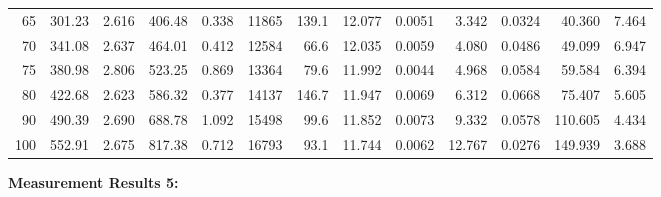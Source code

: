 \documentclass[10pt]{article}
\begin{document}
{\begin{tabular}{|r|rr|rr|rr|rr|rr|r|r|}
       65 &       301.23 &        2.616 &       406.48 &        0.338 &        11865 &        139.1 &       12.077 &       0.0051 &        3.342 &       0.0324 &       40.360 &        7.464 \\
       70 &       341.08 &        2.637 &       464.01 &        0.412 &        12584 &         66.6 &       12.035 &       0.0059 &        4.080 &       0.0486 &       49.099 &        6.947 \\
       75 &       380.98 &        2.806 &       523.25 &        0.869 &        13364 &         79.6 &       11.992 &       0.0044 &        4.968 &       0.0584 &       59.584 &        6.394 \\
       80 &       422.68 &        2.623 &       586.32 &        0.377 &        14137 &        146.7 &       11.947 &       0.0069 &        6.312 &       0.0668 &       75.407 &        5.605 \\
       90 &       490.39 &        2.690 &       688.78 &        1.092 &        15498 &         99.6 &       11.852 &       0.0073 &        9.332 &       0.0578 &      110.605 &        4.434 \\
      100 &       552.91 &        2.675 &       817.38 &        0.712 &        16793 &         93.1 &       11.744 &       0.0062 &       12.767 &       0.0276 &      149.939 &        3.688 \\
\hline
\end{tabular}
}

\vspace{3mm}

\noindent
{\large \bf Measurement Results 5:}
\vspace{3mm}
\end{document}
